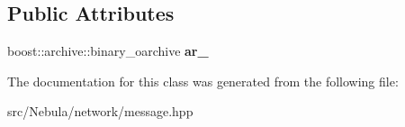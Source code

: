 \subsection*{\-Public \-Attributes}
\begin{DoxyCompactItemize}
\item 
\hypertarget{classgal_1_1network_1_1omessage_a9de736888b2431c56c24e7229e300722}{boost\-::archive\-::binary\-\_\-oarchive {\bfseries ar\-\_\-}}\label{classgal_1_1network_1_1omessage_a9de736888b2431c56c24e7229e300722}

\end{DoxyCompactItemize}


\-The documentation for this class was generated from the following file\-:\begin{DoxyCompactItemize}
\item 
src/\-Nebula/network/message.\-hpp\end{DoxyCompactItemize}
